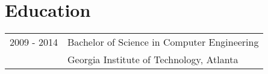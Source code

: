 \documentclass[letterpaper]{article}
\begin{document}
\section*{Education}
\begin{tabular}{rl}
    2009 - 2014 & Bachelor of Science in {Computer Engineering}\\
    & {Georgia Institute of Technology}, Atlanta\\
\end{tabular}
\end{document}
